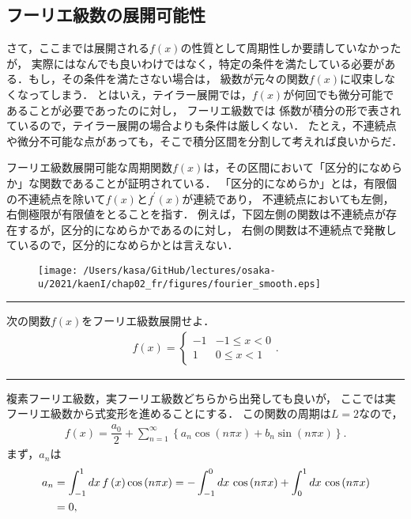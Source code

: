 \subsection{フーリエ級数の展開可能性}
%
さて，ここまでは展開される$f(x)$の性質として周期性しか要請していなかったが，
実際にはなんでも良いわけではなく，特定の条件を満たしている必要がある．もし，その条件を満たさない場合は，
級数が元々の関数$f(x)$に収束しなくなってしまう．
とはいえ，テイラー展開では，$f\left(x\right)$が何回でも微分可能であることが必要であったのに対し，
フーリエ級数では
係数が積分の形で表されているので，テイラー展開の場合よりも条件は厳しくない．
たとえ，不連続点や微分不可能な点があっても，そこで積分区間を分割して考えれば良いからだ．

フーリエ級数展開可能な周期関数$f(x)$は，その区間において「区分的になめらか」な関数であることが証明されている．
「区分的になめらか」とは，有限個の不連続点を除いて$f(x)$と$f^{\prime}(x)$が連続であり，
不連続点においても左側，右側極限が有限値をとることを指す．
例えば，下図左側の関数は不連続点が存在するが，区分的になめらかであるのに対し，
右側の関数は不連続点で発散しているので，区分的になめらかとは言えない．
\begin{figure}[htbp]
 \texttt{[image: /Users/kasa/GitHub/lectures/osaka-u/2021/kaenI/chap02\_fr/figures/fourier\_smooth.eps]} 
\end{figure}
%
\newpage
%
\hrule
\reidai
次の関数$f(x)$をフーリエ級数展開せよ．
\begin{align}
  f\left(x\right) =
  \begin{cases}
    -1 & -1 \leq x < 0 \\
     1 & 0  \leq x < 1 
  \end{cases}. 
\end{align}
\vspace*{.2cm}
\hrule
\vspace*{.2cm}
複素フーリエ級数，実フーリエ級数どちらから出発しても良いが，
ここでは実フーリエ級数から式変形を進めることにする．
この関数の周期は$L=2$なので，
\begin{align}
 f\left(x\right) = \dfrac{a_0}{2} 
                   + \sum_{n=1}^{\infty}\left\{a_n \cos\left(n\pi x\right)
                                             +b_n \sin\left(n\pi x\right)\right\}.
\end{align}
まず，$a_n$は
\begin{align}
  a_n &= \int_{-1}^{1}dx\,f\left(x\right)\cos\left(n\pi x\right) 
       = -\int_{-1}^{0}dx\, \cos\left(n\pi x\right) + \int_{0}^{1}dx\,\cos\left(n\pi x\right) \notag \\
      &= 0,
\end{align}
